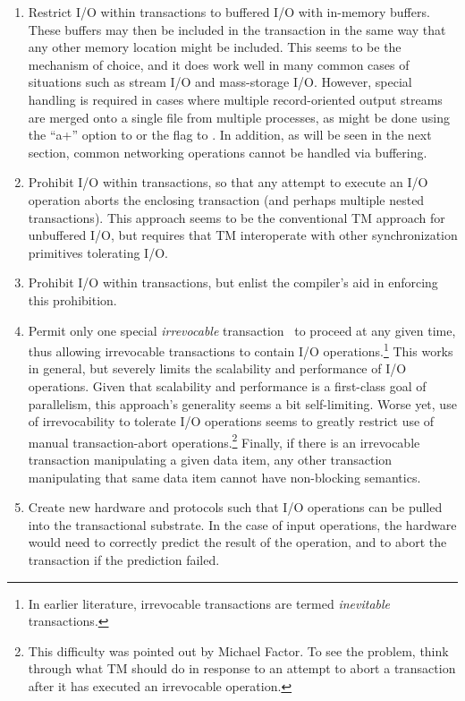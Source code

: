 \begin{enumerate}
\item	Restrict I/O within transactions to buffered I/O with in-memory
	buffers.
	These buffers may then be included in the transaction in the
	same way that any other memory location might be included.
	This seems to be the mechanism of choice, and it does work
	well in many common cases of situations such as stream I/O and
	mass-storage I/O\@.
	However, special handling is required in cases where multiple
	record-oriented output streams are merged onto a single file
	from multiple processes, as might be done using the ``a+''
	option to  or the  flag to .
	In addition, as will be seen in the next section, common
	networking operations cannot be handled via buffering.
\item	Prohibit I/O within transactions, so that any attempt to execute
	an I/O operation aborts the enclosing transaction (and perhaps
	multiple nested transactions).
	This approach seems to be the conventional TM approach for
	unbuffered I/O, but requires that TM interoperate with other
	synchronization primitives tolerating I/O.
\item	Prohibit I/O within transactions, but enlist the compiler's aid
	in enforcing this prohibition.
\item	Permit only one special
	\emph{irrevocable} transaction~\cite{SpearMichaelScott2008InevitableSTM}
	to proceed
	at any given time, thus allowing irrevocable transactions to
	contain I/O operations.\footnote{
		In earlier literature, irrevocable transactions are
		termed \emph{inevitable} transactions.}
	This works in general, but severely limits the scalability and
	performance of I/O operations.
	Given that scalability and performance is a first-class goal of
	parallelism, this approach's generality seems a bit self-limiting.
	Worse yet, use of irrevocability to tolerate I/O operations
	seems to greatly restrict use of manual transaction-abort
	operations.\footnote{
		This difficulty was pointed out by Michael Factor.
		To see the problem, think through what TM should do
		in response to an attempt to abort a transaction after
		it has executed an irrevocable operation.}
	Finally, if there is an irrevocable transaction manipulating
	a given data item, any other transaction manipulating that
	same data item cannot have non-blocking semantics.
\item	Create new hardware and protocols such that I/O operations can
	be pulled into the transactional substrate.
	In the case of input operations, the hardware would need to
	correctly predict the result of the operation, and to abort the
	transaction if the prediction failed.
\end{enumerate}

